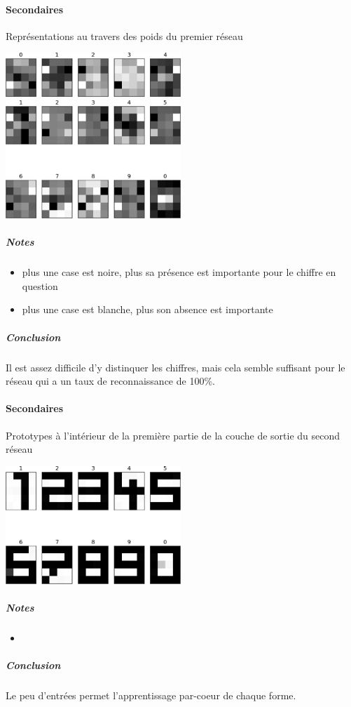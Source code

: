     \paragraph*{Secondaires}
      Représentations au travers des poids du premier réseau
      \begin{center}
	\includegraphics[width=250px]{data/expA1/representation_hidden.png}
	\includegraphics[width=250px]{data/expA1/representation.png}
      \end{center} 
      \subparagraph*{Notes}
	\begin{itemize}
	  \item plus une case est noire, plus sa présence est importante pour le chiffre en question
	  \item plus une case est blanche, plus son absence est importante
	\end{itemize}
      \subparagraph*{Conclusion}
	Il est assez difficile d'y distinquer les chiffres, mais cela semble suffisant pour le réseau
	qui a un taux de reconnaissance de 100\%.
    \paragraph*{Secondaires}
      Prototypes à l'intérieur de la première partie de la couche de sortie du second réseau
      \begin{center}
	\includegraphics[width=250px]{data/expA1/prototype.png}
      \end{center} 
      \subparagraph*{Notes}
	\begin{itemize}
	  \item 
	\end{itemize}
      \subparagraph*{Conclusion}
	Le peu d'entrées permet l'apprentissage par-coeur de chaque forme.
	


